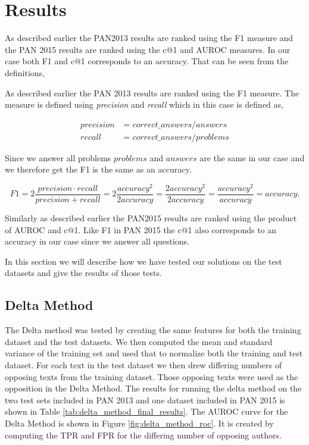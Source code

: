 \section{Results}
As described earlier the PAN2013 results are ranked using the F1 measure and the
PAN 2015 results are ranked using the c@1 and AUROC measures. In our case both
F1 and c@1 corresponds to an accuracy. That can be seen from the definitions,

As described earlier the PAN 2013 results are ranked using the F1 measure. The
measure is defined using \textit{precision} and \textit{recall} which in this
case is defined as,

\begin{align}
    precision &=  correct\_answers / answers \\
    recall &= correct\_answers / problems
\end{align}

Since we answer all problems $problems$ and $answers$ are the same in our case
and we therefore get the F1 is the same as an accuracy.

\begin{equation}
    F1 = 2 \frac{precision \cdot recall}{precision + recall}
        = 2 \frac{accuracy^2}{2accuracy}
        = \frac{2accuracy^2}{2accuracy}
        = \frac{accuracy^2}{accuracy}
        = accuracy.
\end{equation}

Similarly as described earlier the PAN2015 results are ranked using the product
of AUROC and c@1. Like F1 in PAN 2015 the c@1 also corresponds to an accuracy in
our case since we answer all questions. %

In this section we will describe how we have tested our solutions on the test
datasets and give the results of those tests.

\subsection{Delta Method}
The Delta method was tested by creating the same features for both the training
dataset and the test datasets. We then computed the mean and standard variance
of the training set and used that to normalize both the training and test
dataset. For each text in the test dataset we then drew differing numbers of
opposing texts from the training dataset. Those opposing texts were used as the
opposition in the Delta Method. The results for running the delta method on the
two test sets included in PAN 2013 and one dataset included in PAN 2015 is shown
in Table \ref{tab:delta_method_final_results}. The AUROC curve for the Delta
Method is shown in Figure \ref{fig:delta_method_roc}. It is created by computing
the \gls{TPR} and \gls{FPR} for the differing number of opposing authors.

